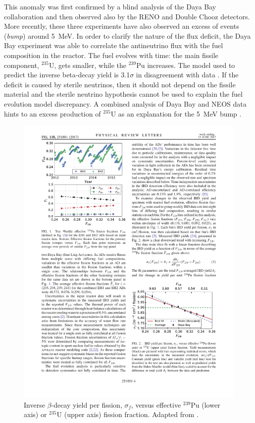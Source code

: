     This anomaly was first confirmed by a blind analysis of the Daya Bay collaboration \cite{An:2015nua} and then observed also by the RENO and Double Chooz detectors. More recently, these three experiments have also observed an excess of events (\emph{bump}) around 5~MeV. 
    In order to clarify the nature of the flux deficit, the Daya Bay experiment was able to correlate the antineutrino flux with the fuel composition in the reactor. The fuel evolves with time: the main fissile component, $^{235}$U, gets smaller, while the $^{239}$Pu increases. The model used to predict the inverse beta-decay yield is 3.1$\sigma$ in disagreement with data \cite{An:2017osx}. If the deficit is caused by sterile neutrinos, then it should not depend on the fissile material and the sterile neutrino hypothesis cannot be used to explain the fuel evolution model discrepancy. A combined analysis of Daya Bay and NEOS data hints to an excess production of $^{235}$U as an explanation for the 5~MeV bump \cite{Huber:2016xis}. 
    
    \begin{figure}[htbp]
      \centering
      \includegraphics[width=0.75\linewidth]{figures/dayabay.pdf}
      \caption{Inverse $\beta$-decay yield per fission, $\sigma_f$, versus effective $^{239}$Pu (lower axis) or $^{235}$U (upper axis) fission fraction. Adapted from \cite{An:2017osx}.}
    \label{fig:dayabay}
    \end{figure}
    
